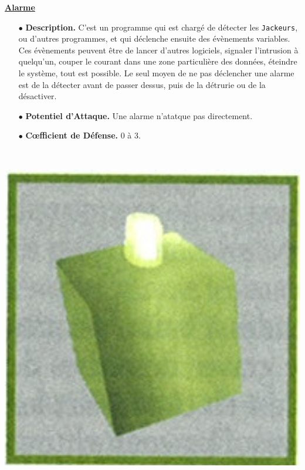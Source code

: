 \documentclass[11pt,twoside,a4paper]{article}
\begin{document}
\begin{multicols*}{2}
\underline{\textbf{Alarme}} %
	\begin{itemize}
		\item[$\bullet$] \textbf{Description. } C'est un programme qui est charg{\'e} de d{\'e}tecter les \texttt{Jackeurs}, ou d'autres programmes, et qui d{\'e}clenche ensuite des {\'e}v{\`e}nements variables. Ces {\'e}v{\`e}nements peuvent {\^e}tre de lancer d'autres logiciels, signaler l'intrusion {\`a} quelqu'un, couper le courant dans une zone particuli{\`e}re des donn{\'e}es, {\'e}teindre le syst{\`e}me, tout est possible. Le seul moyen de ne pas d{\'e}clencher une alarme est de la d{\'e}tecter avant de passer dessus, puis de la d{\'e}trurie ou de la d{\'e}sactiver. 
		\item[$\bullet$] \textbf{Potentiel d'Attaque. }Une alarme n'atatque pas directement. 
		\item[$\bullet$] \textbf{C\oe fficient de D{\'e}fense. }0 {\`a} 3. 
	\end{itemize}~\\
\begin{minipage}[h]{0.12\textwidth}
	\includegraphics[width=1.38\textwidth]{img/catalogueProgrammesAlarme.jpg}~\\
\end{minipage} \hfill \begin{minipage}[h]{0.37\textwidth}

\end{minipage}
\end{multicols*}
\end{document}
